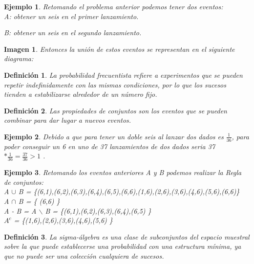 \documentclass[12pt]{article}
\newtheorem{Def}{\quad Definición}
\newtheorem{Ejem}{\quad Ejemplo}
\newtheorem{Images}{\quad Imagen}
\begin{document}
\begin{Ejem}
Retomando el problema anterior podemos tener dos eventos: 
\\

A: obtener un seis en el primer lanzamiento. 

B: obtener un seis en el segundo lanzamiento. 
\end{Ejem}

\begin{Images}
Entonces la unión de estos eventos se representan  en el siguiente diagrama: 

\end{Images}


\begin{Def} 
La probabilidad frecuentista refiere a experimentos que se pueden repetir indefinidamente con las mismas condiciones, por lo que los sucesos tienden a estabilizarse alrededor de un número fijo. 
\end{Def}

\begin{Def} 
Las propiedades de conjuntos son los eventos que se pueden combinar para dar lugar a nuevos eventos.
\end{Def}

\begin{Ejem}
Debido a que para tener un doble seis al lanzar dos dados es $\frac{1}{36}$, para poder conseguir un 6 en uno de 37 lanzamientos de dos dados seria 37$* \frac{1}{36} = \frac{37}{36} > 1$ .
\end{Ejem}

\begin{Ejem}
Retomando los eventos anteriores A y B podemos realizar la Regla de conjuntos: \\
A $\cup$ B = \{(6,1),(6,2),(6,3),(6,4),(6,5),(6,6),(1,6),(2,6),(3,6),(4,6),(5,6),(6,6)\} \\
A $\cap$ B = \{ (6,6) \} \\
A - B = A $\backslash$ B = \{(6,1),(6,2),(6,3),(6,4),(6,5) \} \\
$A^c$ = \{(1,6),(2,6),(3,6),(4,6),(5,6) \}
\end{Ejem}

\begin{Def} 
La sigma-álgebra es una clase de subconjuntos del espacio muestral sobre la que puede establecerse una probabilidad con una estructura mínima, ya que no puede ser una colección cualquiera de sucesos.
\end{Def}
\end{document}

